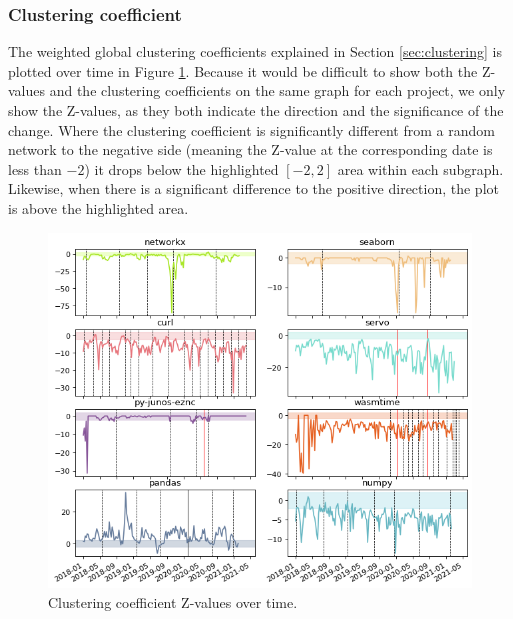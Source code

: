 \subsubsection{Clustering coefficient}

The weighted global clustering coefficients explained in Section \ref{sec:clustering} is plotted over time in Figure \ref{fig:clust}. Because it would be difficult to show both the Z-values and the clustering coefficients on the same graph for each project, we only show the Z-values, as they both indicate the direction and the significance of the change. Where the clustering coefficient is significantly different from a random network to the negative side (meaning the Z-value at the corresponding date is less than $-2$) it drops below the highlighted $[-2, 2]$ area within each subgraph. Likewise, when there is a significant difference to the positive direction, the plot is above the highlighted area.

\begin{figure}
    \centering
    \includegraphics[width=\textwidth]{figures/qualitative/clustering_coeff/clustering_z.png}
    \caption{Clustering coefficient Z-values over time.}
    \label{fig:clust}
\end{figure}

